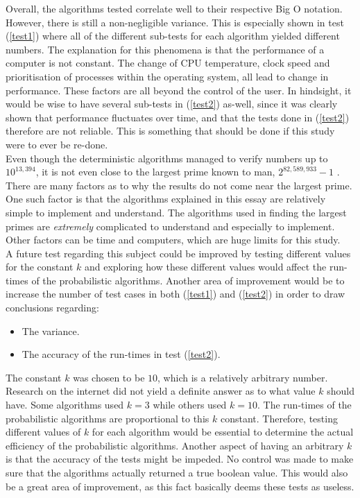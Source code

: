 \documentclass[main.tex]{subfiles}
\begin{document}
Overall, the algorithms tested correlate well to their respective Big O
notation. However, there is still a non-negligible variance. This is especially
shown in test (\ref{test1}) where all of the different sub-tests for each
algorithm yielded different numbers. The explanation for this phenomena is that
the performance of a computer is not constant. The change of CPU temperature,
clock speed and prioritisation of processes within the operating system, all
lead to change in performance. These factors are all beyond the control of the
user. In hindsight, it would be wise to have several sub-tests in (\ref{test2})
as-well, since it was clearly shown that performance fluctuates over time, and
that the tests done in (\ref{test2}) therefore are not reliable. This is
something that should be done if this study were to ever be re-done. \\

Even though the deterministic algorithms managed to verify numbers up to
$10^{13,394}$, it is not even close to the largest prime known to man,
$2^{82,589,933} - 1$ \cite{prime:largest_digits}. There are many factors as to
why the results do not come near the largest prime. One such factor is that the
algorithms explained in this essay are relatively simple to implement and
understand. The
algorithms used in finding the largest primes are \emph{extremely} complicated
to understand and especially to implement. Other factors can be time and computers, which are huge limits for this study. \\

A future test regarding this subject could be improved by testing different
values for the constant $k$ and exploring how these different values would
affect the run-times of the probabilistic algorithms. Another area of improvement
would be to increase the number of test cases in both (\ref{test1}) and
(\ref{test2}) in order to draw conclusions regarding:

\begin{itemize}
  \item The variance.
  \item The accuracy of the run-times in test (\ref{test2}).
\end{itemize}

The constant $k$ was chosen to be $10$, which is a relatively arbitrary number.
Research on the internet did not yield a definite answer as to what value $k$
should have. Some algorithms used $k = 3$ while others used $k = 10$. The run-times of the probabilistic algorithms are proportional to this $k$ constant.
Therefore, testing different values of $k$ for each algorithm would be essential
to determine the actual efficiency of the probabilistic algorithms. Another
aspect of having an arbitrary $k$ is that the accuracy of the tests might be
impeded. No control was made to make sure that the algorithms actually returned
a true boolean value. This would also be a great area of improvement, as this
fact basically deems these tests as useless. \\
\end{document}
